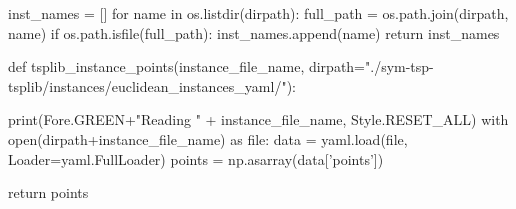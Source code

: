      inst_names = []
     for name in os.listdir(dirpath):
         full_path = os.path.join(dirpath, name)
         if os.path.isfile(full_path):
             inst_names.append(name)
     return inst_names

def tsplib_instance_points(instance_file_name, dirpath="./sym-tsp-tsplib/instances/euclidean_instances_yaml/"):

        print(Fore.GREEN+"Reading " + instance_file_name, Style.RESET_ALL)
        with open(dirpath+instance_file_name) as file:
            data = yaml.load(file, Loader=yaml.FullLoader)
            points = np.asarray(data['points'])
        
        return points 
           
\nwendcode{}\nwdocspar


